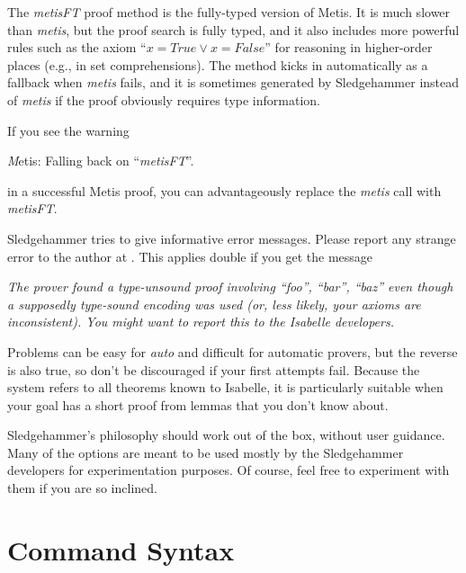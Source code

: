 \documentclass[a4paper,12pt]{article}
\begin{document}

The \textit{metisFT} proof method is the fully-typed version of Metis. It is
much slower than \textit{metis}, but the proof search is fully typed, and it
also includes more powerful rules such as the axiom ``$x = \mathit{True}
\mathrel{\lor} x = \mathit{False}$'' for reasoning in higher-order places (e.g.,
in set comprehensions). The method kicks in automatically as a fallback when
\textit{metis} fails, and it is sometimes generated by Sledgehammer instead of
\textit{metis} if the proof obviously requires type information.

If you see the warning

\prew
\textsl
Metis: Falling back on ``\textit{metisFT}''.
\postw

in a successful Metis proof, you can advantageously replace the \textit{metis}
call with \textit{metisFT}.


Sledgehammer tries to give informative error messages. Please report any strange
error to the author at \authoremail. This applies double if you get the message

\prew
\slshape
The prover found a type-unsound proof involving ``\textit{foo}'',
``\textit{bar}'', ``\textit{baz}'' even though a supposedly type-sound encoding
was used (or, less likely, your axioms are inconsistent). You might want to
report this to the Isabelle developers.
\postw


Problems can be easy for \textit{auto} and difficult for automatic provers, but
the reverse is also true, so don't be discouraged if your first attempts fail.
Because the system refers to all theorems known to Isabelle, it is particularly
suitable when your goal has a short proof from lemmas that you don't know about.


Sledgehammer's philosophy should work out of the box, without user guidance.
Many of the options are meant to be used mostly by the Sledgehammer developers
for experimentation purposes. Of course, feel free to experiment with them if
you are so inclined.

\section{Command Syntax}
\label{command-syntax}
\end{document}
